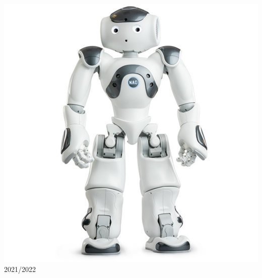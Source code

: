 \documentclass[12pt,a4paper,twoside]{report}
\begin{document}
\begin{center}
\includegraphics[scale=0.32]{NAO.jpg} \\
\vspace{0.3cm}
2021/2022
\end{center}
\vspace{-2cm}
\end{document}

